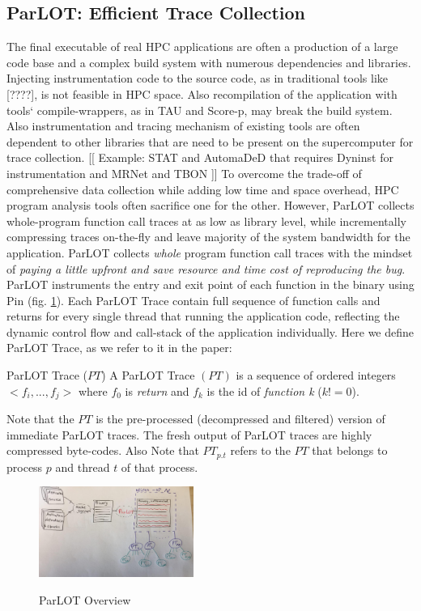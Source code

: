 \subsection{ParLOT: Efficient Trace Collection}
\label{subsec:parlot}

The final executable of real HPC applications are often a production of a large code base and a complex build system with numerous dependencies and libraries. Injecting instrumentation code to the source code, as in traditional tools like [????], is not feasible in HPC space. Also recompilation of the application with tools` compile-wrappers, as in TAU\cite{tau} and Score-p\cite{scorep}, may break the build system. 
Also instrumentation and tracing mechanism of existing tools are often dependent to other libraries that are need to be present on the supercomputer for trace collection. [[ Example: STAT\cite{stat} and AutomaDeD\cite{automaded-laguna} that requires Dyninst\cite{dyninst} for instrumentation and MRNet\cite{mrnet} and TBON \cite{tbon}]]
%
To overcome the trade-off of comprehensive data collection while adding low time and space overhead, HPC program analysis tools often sacrifice one for the other. However, ParLOT collects whole-program function call traces at as low as library level, while incrementally compressing traces on-the-fly and leave majority of the system bandwidth for the application. 
%
ParLOT collects \textit{whole} program function call traces with the mindset of \textit{paying a little upfront and save resource and time cost of reproducing the bug}.
%
ParLOT instruments the entry and exit point of each function in the binary using Pin\cite{pin} (fig. \ref{fig.parlotOverview}). Each ParLOT Trace contain full sequence of function calls and returns for every single thread that running the application code, reflecting the dynamic control flow and call-stack of the application individually.
%
Here we define ParLOT Trace, as we refer to it in the paper:
\begin{definition}{ParLOT Trace ($PT$)}
A ParLOT Trace $(PT)$ is a sequence of ordered integers $<f_i,...,f_j>$ where $f_0$ is \textit{return} and $f_k$ is the id of \textit{function k} ($k!=0$).
\end{definition}
%
Note that the $PT$ is the pre-processed (decompressed and filtered) version of immediate ParLOT traces. The fresh output of ParLOT traces are highly compressed byte-codes. 
%
Also Note that $PT_{p.t}$ refers to the $PT$ that belongs to process $p$ and thread $t$ of that process.
%
\begin{figure}[t]
\caption{ParLOT Overview}
\includegraphics[width=0.45\textwidth]{figs/parlotOverview.jpg}
\label{fig.parlotOverview}
\end{figure}



